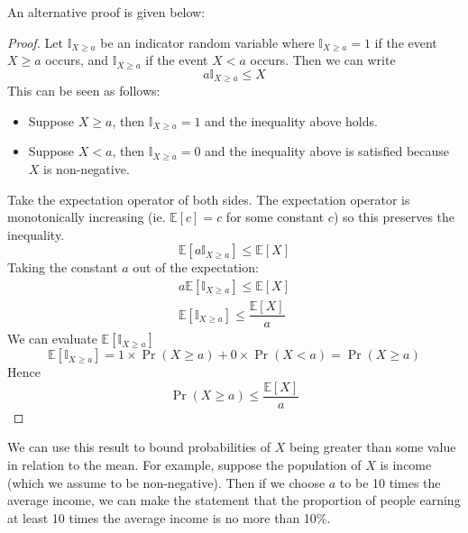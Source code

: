 \documentclass[11pt]{report} %
\begin{document}
An alternative proof is given below:
\begin{proof}
Let $\mathbb{I}_{X \geq a}$ be an indicator random variable where $\mathbb{I}_{X \geq a} = 1$ if the event $X \geq a$ occurs, and $\mathbb{I}_{X \geq a}$ if the event $X < a$ occurs. Then we can write
\begin{equation}
a\mathbb{I}_{X \geq a} \leq X
\end{equation}
This can be seen as follows:
\begin{itemize}
\item Suppose $X \geq a$, then $\mathbb{I}_{X \geq a} = 1$ and the inequality above holds.
\item Suppose $X < a$, then $\mathbb{I}_{X \geq a} = 0$ and the inequality above is satisfied because $X$ is non-negative.
\end{itemize}
Take the expectation operator of both sides. The expectation operator is monotonically increasing (ie. $\mathbb{E}\left[c\right] = c$ for some constant $c$) so this preserves the inequality.
\begin{equation}
\mathbb{E}\left[a\mathbb{I}_{X \geq a}\right] \leq \mathbb{E}\left[X\right]
\end{equation}
Taking the constant $a$ out of the expectation:
\begin{gather}
a\mathbb{E}\left[\mathbb{I}_{X \geq a}\right] \leq \mathbb{E}\left[X\right] \\
\mathbb{E}\left[\mathbb{I}_{X \geq a}\right] \leq \dfrac{\mathbb{E}\left[X\right]}{a}
\end{gather}
We can evaluate $\mathbb{E}\left[\mathbb{I}_{X \geq a}\right]$
\begin{equation}
\mathbb{E}\left[\mathbb{I}_{X \geq a}\right] = 1\times\operatorname{Pr}\left(X\geq a\right) + 0\times\operatorname{Pr}\left(X < a\right) = \operatorname{Pr}\left(X\geq a\right)
\end{equation}
Hence
\begin{equation}
\operatorname{Pr}\left(X\geq a\right) \leq \dfrac{\mathbb{E}\left[X\right]}{a}
\end{equation}

\end{proof}
We can use this result to bound probabilities of $X$ being greater than some value in relation to the mean. For example, suppose the population of $X$ is income (which we assume to be non-negative). Then if we choose $a$ to be 10 times the average income, we can make the statement that the proportion of people earning at least 10 times the average income is no more than 10\%.
\end{document}
